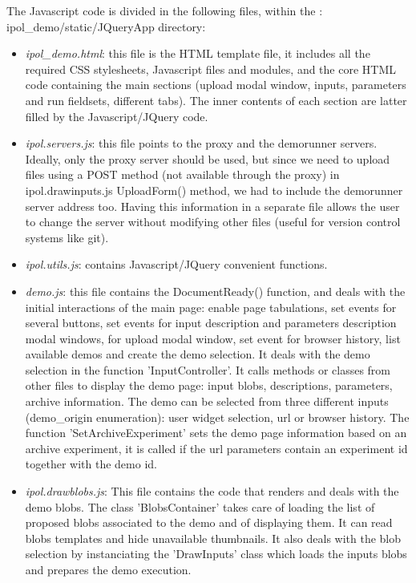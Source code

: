 The Javascript code is divided in the following files, within the :
ipol\_demo/\-static/\-JQuery\-App directory:
\begin{itemize}

 \item \emph{ipol\_demo.html}: this file is the HTML template file, it includes all the
  required CSS stylesheets, Javascript files and modules, and the core HTML
  code containing the main sections (upload modal window, inputs, parameters and 
  run fieldsets, different tabs). The inner contents of each section are latter
  filled by the Javascript/JQuery code.

 \item \emph{ipol.servers.js}: this file points to the proxy and the demorunner
  servers. Ideally, only the proxy server should be used, but since we need to upload
  files using a POST method (not available through the proxy) in ipol.drawinputs.js 
  UploadForm() method, we had to include the demorunner server address too.
  Having this information in a separate file allows the user to change the server
  without modifying other files (useful for version control systems like git).

 \item \emph{ipol.utils.js}: contains Javascript/JQuery convenient functions.

 \item \emph{demo.js}: this file contains the DocumentReady() function,
  and deals with the initial interactions of the main page: enable page tabu\-lations,
  set events for several buttons, set events for input description and parameters
  description modal windows, for upload modal window, set event for browser history,
  list available demos and create the demo selection. It deals with
  the demo selection in the function 'Input\-Controller'. It calls methods or classes
  from other files to display the demo page: input blobs, descriptions, parameters,
  archive information. 
  The demo can be selected
  from three different inputs (demo\_origin enumeration): user widget selection,
  url or browser history. The function 'Set\-Archive\-Experiment' sets the demo
  page information based on an archive experiment, it is called if the url parameters
  contain an experiment id together with the demo id.


 \item \emph{ipol.drawblobs.js}: This file contains the code that renders and 
  deals with the demo blobs. The class 'BlobsContainer' takes care of loading
  the list of proposed blobs associated to the demo and of displaying them.
  It can read blobs templates and hide unavailable thumbnails. It also
  deals with the blob selection by instanciating the 'DrawInputs' class which loads
  the inputs blobs and prepares the demo execution.


\end{itemize}
